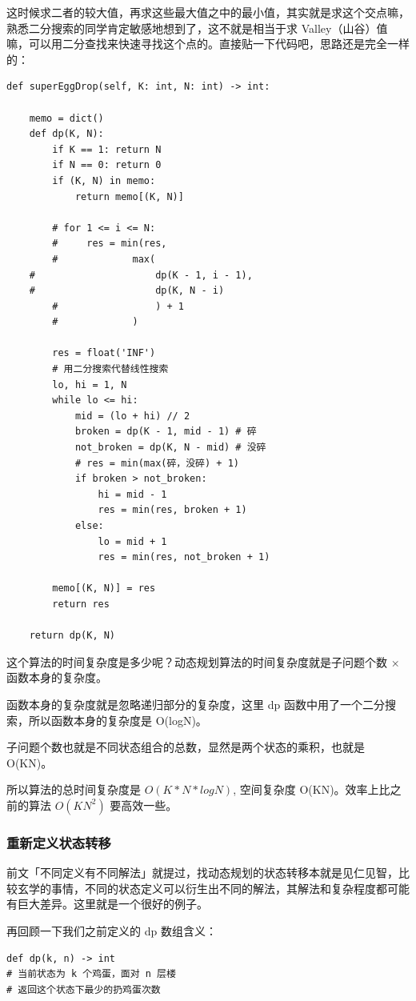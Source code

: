 \documentclass[12pt]{article}
\begin{document}
这时候求二者的较大值，再求这些最大值之中的最小值，其实就是求这个交点嘛，熟悉二分搜索的同学肯定敏感地想到了，这不就是相当于求 Valley（山谷）值嘛，可以用二分查找来快速寻找这个点的。直接贴一下代码吧，思路还是完全一样的：
\begin{lstlisting}
def superEggDrop(self, K: int, N: int) -> int:
        
    memo = dict()
    def dp(K, N):
        if K == 1: return N
        if N == 0: return 0
        if (K, N) in memo:
            return memo[(K, N)]
                            
        # for 1 <= i <= N:
        #     res = min(res, 
        #             max( 
    #                     dp(K - 1, i - 1), 
    #                     dp(K, N - i)      
        #                 ) + 1 
        #             )

        res = float('INF')
        # 用二分搜索代替线性搜索
        lo, hi = 1, N
        while lo <= hi:
            mid = (lo + hi) // 2
            broken = dp(K - 1, mid - 1) # 碎
            not_broken = dp(K, N - mid) # 没碎
            # res = min(max(碎，没碎) + 1)
            if broken > not_broken:
                hi = mid - 1
                res = min(res, broken + 1)
            else:
                lo = mid + 1
                res = min(res, not_broken + 1)

        memo[(K, N)] = res
        return res
    
    return dp(K, N)
\end{lstlisting}
这个算法的时间复杂度是多少呢？动态规划算法的时间复杂度就是子问题个数 × 函数本身的复杂度。

函数本身的复杂度就是忽略递归部分的复杂度，这里 dp 函数中用了一个二分搜索，所以函数本身的复杂度是 O(logN)。

子问题个数也就是不同状态组合的总数，显然是两个状态的乘积，也就是 O(KN)。

所以算法的总时间复杂度是 $O(K*N*logN)$, 空间复杂度 O(KN)。效率上比之前的算法 $O(KN^2)$ 要高效一些。

\subsubsection{重新定义状态转移}
前文「不同定义有不同解法」就提过，找动态规划的状态转移本就是见仁见智，比较玄学的事情，不同的状态定义可以衍生出不同的解法，其解法和复杂程度都可能有巨大差异。这里就是一个很好的例子。

再回顾一下我们之前定义的 dp 数组含义：
\begin{lstlisting}
def dp(k, n) -> int
# 当前状态为 k 个鸡蛋，面对 n 层楼
# 返回这个状态下最少的扔鸡蛋次数
\end{lstlisting}
\end{document}
